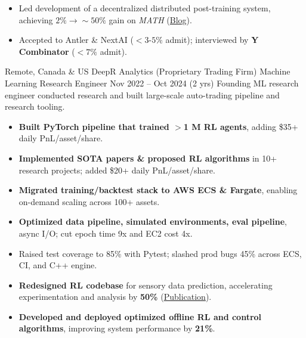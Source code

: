 \begin{itemize}
        \item Led development of a decentralized distributed post-training system, achieving $2\% \rightarrow \sim\!50\%$ gain on \textit{MATH} (\href{https://templarresearch.substack.com/p/grail-v0-how-we-built-a-fully-open}{Blog}).
        \item Accepted to Antler \& NextAI ($<$$3$-$5\%$ admit); interviewed by \textbf{Y Combinator} ($<$$7\%$ admit).
    \end{itemize}


{\customcventry
    {Remote, Canada \& US}
    {DeepR Analytics (Proprietary Trading Firm)}
    {Machine Learning Research Engineer}
    {Nov 2022 – Oct 2024 (2 yrs)}{}{}}
    Founding ML research engineer conducted research and built large-scale auto-trading pipeline and research tooling.
    \begin{itemize}
        \item \textbf{Built PyTorch pipeline that trained $>$1 M RL agents}, adding \$35+ daily PnL/asset/share.
        \item \textbf{Implemented SOTA papers \& proposed RL algorithms} in 10+ research projects; added \$20+ daily PnL/asset/share.
        \item \textbf{Migrated training/backtest stack to AWS ECS \& Fargate}, enabling on-demand scaling across 100+ assets.
        \item \textbf{Optimized data pipeline, simulated environments, eval pipeline}, async I/O; cut epoch time 9x and EC2 cost 4x.
        \item Raised test coverage to 85\% with Pytest; slashed prod bugs 45\% across ECS, CI, and C++ engine.
    \end{itemize}
  

{
}
\begin{itemize}
    \item \textbf{Redesigned RL codebase} for sensory data prediction, accelerating experimentation and analysis by \textbf{50\%} (\href{https://link.springer.com/article/10.1007/s10994-023-06413-x}{Publication}).
    \item \textbf{Developed and deployed optimized offline RL and control algorithms}, improving system performance by \textbf{21\%}.
\end{itemize}

